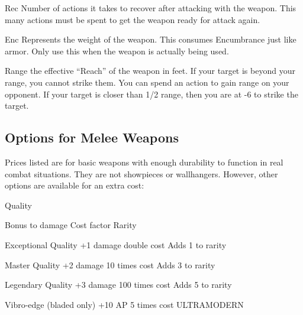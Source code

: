 \documentclass[twoside]{book}
\begin{document}
            
                Rec   Number of actions it
                takes to recover after attacking with the weapon. This
                many actions must be spent to get the weapon ready for
                attack again.
              
            
                Enc   Represents the weight of
                the weapon. This consumes Encumbrance just like armor.
                Only use this when the weapon is actually being used.
              
            
                Range   the effective
                “Reach” of the weapon in feet. If your target
                is beyond your range, you cannot strike them. You can
                spend an action to gain range on your opponent. If your
                target is closer than 1/2 range, then you are at -6 to
                strike the target.
              
          
\subsection{Options for Melee Weapons}
      Prices listed are for basic weapons with enough
               durability to function in real combat situations. They are
               not showpieces or wallhangers. However, other options are
               available for an extra cost:   
                
                  
                     Quality
                     
                   Bonus to damage   
                   Cost factor   
                   Rarity   
                  
                  
                  
                   Exceptional Quality   
                   +1 damage   
                   double cost 
                   Adds 1 to rarity   
                  
                  
                   Master Quality 
                   +2 damage 
                   10 times cost 
                   Adds 3 to rarity   
                  
                  
                   Legendary Quality 
                   +3 damage 
                   100 times cost 
                   Adds 5 to rarity   
                  
                  
                   Vibro-edge (bladed only) 
                   +10 AP 
                   5 times cost 
                   ULTRAMODERN   
                  
\end{document}
